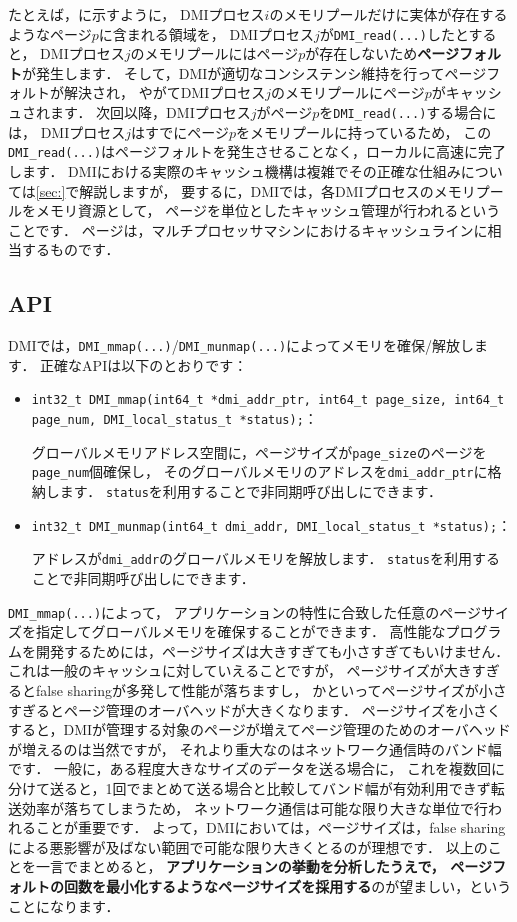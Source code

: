 \documentclass[report,12pt]{jsbook}
\begin{document}
たとえば，に示すように，
DMIプロセス$i$のメモリプールだけに実体が存在するようなページ$p$に含まれる領域を，
DMIプロセス$j$が\texttt{DMI\_read(...)}したとすると，
DMIプロセス$j$のメモリプールにはページ$p$が存在しないため\textbf{ページフォルト}が発生します．
そして，DMIが適切なコンシステンシ維持を行ってページフォルトが解決され，
やがてDMIプロセス$j$のメモリプールにページ$p$がキャッシュされます．
次回以降，DMIプロセス$j$がページ$p$を\texttt{DMI\_read(...)}する場合には，
DMIプロセス$j$はすでにページ$p$をメモリプールに持っているため，
この\texttt{DMI\_read(...)}はページフォルトを発生させることなく，ローカルに高速に完了します．
DMIにおける実際のキャッシュ機構は複雑でその正確な仕組みについては\ref{sec:}で解説しますが，
要するに，DMIでは，各DMIプロセスのメモリプールをメモリ資源として，
ページを単位としたキャッシュ管理が行われるということです．
ページは，マルチプロセッサマシンにおけるキャッシュラインに相当するものです．

\subsection{API}

DMIでは，\texttt{DMI\_mmap(...)}/\texttt{DMI\_munmap(...)}によってメモリを確保/解放します．
正確なAPIは以下のとおりです：
\begin{itemize}
\item \texttt{int32\_t DMI\_mmap(int64\_t *dmi\_addr\_ptr, int64\_t page\_size, int64\_t page\_num, DMI\_local\_status\_t *status);}：
  
  グローバルメモリアドレス空間に，ページサイズが\texttt{page\_size}のページを\texttt{page\_num}個確保し，
  そのグローバルメモリのアドレスを\texttt{dmi\_addr\_ptr}に格納します．
  \texttt{status}を利用することで非同期呼び出しにできます．
\item \texttt{int32\_t DMI\_munmap(int64\_t dmi\_addr, DMI\_local\_status\_t *status);}：
  
  アドレスが\texttt{dmi\_addr}のグローバルメモリを解放します．
  \texttt{status}を利用することで非同期呼び出しにできます．
\end{itemize}

\texttt{DMI\_mmap(...)}によって，
アプリケーションの特性に合致した任意のページサイズを指定してグローバルメモリを確保することができます．
高性能なプログラムを開発するためには，ページサイズは大きすぎても小さすぎてもいけません．
これは一般のキャッシュに対していえることですが，
ページサイズが大きすぎるとfalse sharingが多発して性能が落ちますし，
かといってページサイズが小さすぎるとページ管理のオーバヘッドが大きくなります．
ページサイズを小さくすると，DMIが管理する対象のページが増えてページ管理のためのオーバヘッドが増えるのは当然ですが，
それより重大なのはネットワーク通信時のバンド幅です．
一般に，ある程度大きなサイズのデータを送る場合に，
これを複数回に分けて送ると，1回でまとめて送る場合と比較してバンド幅が有効利用できず転送効率が落ちてしまうため，
ネットワーク通信は可能な限り大きな単位で行われることが重要です．
よって，DMIにおいては，ページサイズは，false sharingによる悪影響が及ばない範囲で可能な限り大きくとるのが理想です．
以上のことを一言でまとめると，
\textbf{アプリケーションの挙動を分析したうえで，
ページフォルトの回数を最小化するようなページサイズを採用する}のが望ましい，ということになります．
\end{document}
